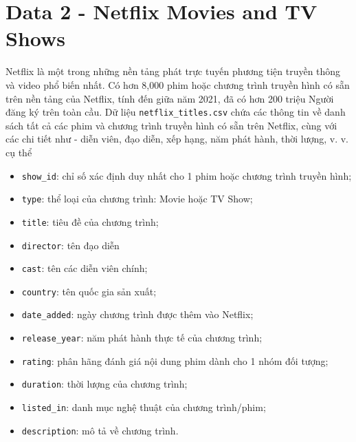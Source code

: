 \documentclass[12pt]{article}
\theoremstyle{definition} \newtheorem{exercise}[theorem]{\bf Bài tập}
\begin{document}
\section*{Data 2 - Netflix Movies and TV Shows}
Netflix là một trong những nền tảng phát trực tuyến phương tiện truyền thông và video phổ biến nhất. Có hơn 8,000 phim hoặc chương trình truyền hình có sẵn trên nền tảng của Netflix, tính đến giữa năm 2021, đã có hơn 200 triệu Người đăng ký trên toàn cầu. Dữ liệu \texttt{netflix\_titles.csv} chứa các thông tin về danh sách tất cả các phim và chương trình truyền hình có sẵn trên Netflix, cùng với các chi tiết như - diễn viên, đạo diễn, xếp hạng, năm phát hành, thời lượng, v. v. cụ thể
\begin{itemize}
\item \texttt{show\_id}: chỉ số xác định duy nhất cho 1 phim hoặc chương trình truyền hình;
\item \texttt{type}: thể loại của chương trình: Movie hoặc TV Show;
\item \texttt{title}: tiêu đề của chương trình;
\item \texttt{director}: tên đạo diễn
\item \texttt{cast}: tên các diễn viên chính;
\item \texttt{country}: tên quốc gia sản xuất;
\item \texttt{date\_added}: ngày chương trình được thêm vào Netflix;
\item \texttt{release\_year}: năm phát hành thực tế của chương trình;
\item \texttt{rating}: phân hãng đánh giá nội dung phim dành cho 1 nhóm đối tượng; 
\item \texttt{duration}: thời lượng của chương trình;
\item \texttt{listed\_in}: danh mục nghệ thuật của chương trình/phim;
\item \texttt{description}: mô tả về chương trình.
\end{itemize}
\end{document}
